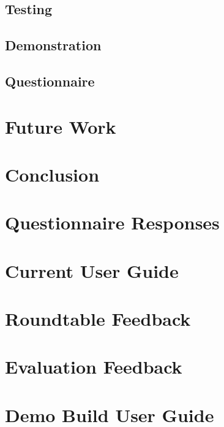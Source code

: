 \documentclass{l3proj}
\begin{document}
\section{Testing}
\label{eval:testing}


\section{Demonstration}
\label{eval:demo}


\section{Questionnaire}
\label{eval:question}



\chapter{Future Work}
\label{future}

\chapter{Conclusion}
\label{conc}

\appendix

\chapter{Questionnaire Responses}
\label{app:questionnaireResponses}


\chapter{Current User Guide}
\label{app:userGuideCurrent}


\chapter{Roundtable Feedback}
\label{app:roundtableFeedback}


\chapter{Evaluation Feedback}
\label{app:evaluationFeedback}


\chapter{Demo Build User Guide}
\label{app:userGuideDemo}
%


\clearpage


\end{document}
